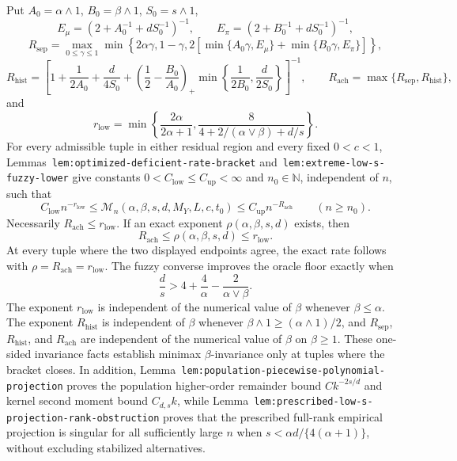 Put \(A_0=\alpha\wedge1\), \(B_0=\beta\wedge1\), \(S_0=s\wedge1\),
\[
E_\mu=\left(2+A_0^{-1}+dS_0^{-1}\right)^{-1},
\qquad
E_\pi=\left(2+B_0^{-1}+dS_0^{-1}\right)^{-1},
\]
\[
R_{\mathrm{sep}}=
\max_{0\le\gamma\le1}
\min\left\{2\alpha\gamma,1-\gamma,
2\left[\min\{A_0\gamma,E_\mu\}+\min\{B_0\gamma,E_\pi\}\right]\right\},
\]
\[
R_{\mathrm{hist}}=
\left[1+\frac1{2A_0}+\frac d{4S_0}
+\left(\frac12-\frac{B_0}{A_0}\right)_+
\min\left\{\frac1{2B_0},\frac d{2S_0}\right\}
\right]^{-1},
\qquad
R_{\mathrm{ach}}=\max\{R_{\mathrm{sep}},R_{\mathrm{hist}}\},
\]
and
\[
r_{\mathrm{low}}=
\min\left\{
\frac{2\alpha}{2\alpha+1},
\frac{8}{4+2/(\alpha\vee\beta)+d/s}
\right\}.
\]
For every admissible tuple in either residual region and every fixed \(0<c<1\), Lemmas~\texttt{lem:optimized-deficient-rate-bracket} and~\texttt{lem:extreme-low-s-fuzzy-lower} give constants \(0<C_{\mathrm{low}}\le C_{\mathrm{up}}<\infty\) and \(n_0\in\mathbb N\), independent of \(n\), such that
\[
C_{\mathrm{low}}n^{-r_{\mathrm{low}}}
\le
\mathcal M_n(\alpha,\beta,s,d,M_Y,L,c,t_0)
\le
C_{\mathrm{up}}n^{-R_{\mathrm{ach}}}
\qquad(n\ge n_0).
\]
Necessarily \(R_{\mathrm{ach}}\le r_{\mathrm{low}}\). If an exact exponent \(\rho(\alpha,\beta,s,d)\) exists, then
\[
R_{\mathrm{ach}}\le\rho(\alpha,\beta,s,d)\le r_{\mathrm{low}}.
\]
At every tuple where the two displayed endpoints agree, the exact rate follows with \(\rho=R_{\mathrm{ach}}=r_{\mathrm{low}}\). The fuzzy converse improves the oracle floor exactly when
\[
\frac ds>4+\frac4\alpha-\frac{2}{\alpha\vee\beta}.
\]
The exponent \(r_{\mathrm{low}}\) is independent of the numerical value of \(\beta\) whenever \(\beta\le\alpha\). The exponent \(R_{\mathrm{hist}}\) is independent of \(\beta\) whenever \(\beta\wedge1\ge(\alpha\wedge1)/2\), and \(R_{\mathrm{sep}}\), \(R_{\mathrm{hist}}\), and \(R_{\mathrm{ach}}\) are independent of the numerical value of \(\beta\) on \(\beta\ge1\). These one-sided invariance facts establish minimax \(\beta\)-invariance only at tuples where the bracket closes. In addition, Lemma~\texttt{lem:population-piecewise-polynomial-projection} proves the population higher-order remainder bound \(Ck^{-2s/d}\) and kernel second moment bound \(C_{d,s}k\), while Lemma~\texttt{lem:prescribed-low-s-projection-rank-obstruction} proves that the prescribed full-rank empirical projection is singular for all sufficiently large \(n\) when \(s<\alpha d/\{4(\alpha+1)\}\), without excluding stabilized alternatives.